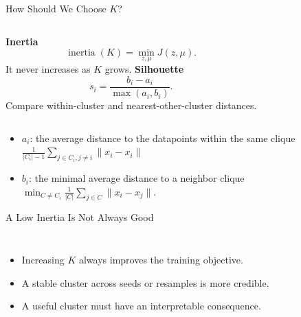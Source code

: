 \begin{frame}{How Should We Choose $K$?}
  \begin{columns}[T,onlytextwidth]
      \textbf{Inertia}
      \[
        \operatorname{inertia}(K)=\min_{z,\mu}J(z,\mu).
      \]
      It never increases as $K$ grows.
      \textbf{Silhouette}
      \[
        s_i=\frac{b_i-a_i}{\max(a_i,b_i)}.
      \]
      Compare within-cluster and nearest-other-cluster distances.
  \end{columns}
  \vspace{.5cm}
  \small
  \begin{itemize}
  	\item $a_i$:  the average distance to the datapoints within the same clique  $\frac{1}{ |C_i|-1} \sum_{j\in C_i, j\neq i} \|x_i - x_i\|$
  	\item $b_i$:  the minimal average distance to a neighbor clique $\min_{C\neq C_i} \frac{1}{|C|} \sum_{j\in C} \| x_i- x_j\|$.
  \end{itemize}
\end{frame}

\begin{frame}{A Low Inertia Is Not Always Good}
  \begin{columns}[c,onlytextwidth]
      \begin{itemize}\spaceditems
        \item Increasing $K$ always improves the training objective.
        \item A stable cluster across seeds or resamples is more credible.
        \item A useful cluster must have an interpretable consequence.
      \end{itemize}
  \end{columns}
\end{frame}

